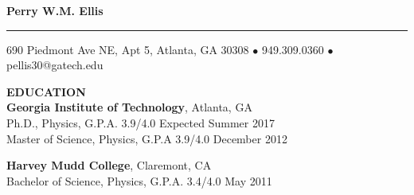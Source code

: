 \documentclass[10pt]{article}
\newcommand{\HRule}{\rule{\linewidth}{0.5mm}}
\newenvironment{changemargin}[2]{%
  \list{}{\rightmargin#2\leftmargin#1
    \parsep=0pt\topsep=1pt\partopsep=0pt}
\item[]} {\endlist}
\newenvironment{indentmore}{\begin{changemargin}{10pt}{0cm}}{\end{changemargin}}
\begin{document}
\begin{center}

\textbf{\Large Perry W.M. Ellis}
\HRule

690 Piedmont Ave NE, Apt 5, Atlanta, GA 30308 $\bullet$ 949.309.0360 $\bullet$ pellis30@gatech.edu

\end{center}


\vspace{10pt}
\textbf{\large EDUCATION} \\
\textbf{Georgia Institute of Technology}, Atlanta, GA\\
\hspace*{10pt}Ph.D., Physics, G.P.A. 3.9/4.0 \hfill Expected Summer 2017\\
\hspace*{10pt}Master of Science, Physics, G.P.A 3.9/4.0 \hfill December 2012 

\vspace{10pt}

\textbf{Harvey Mudd College}, Claremont, CA \\
\hspace*{10pt}Bachelor of Science, Physics, G.P.A. 3.4/4.0 \hfill May 2011
\end{document}
